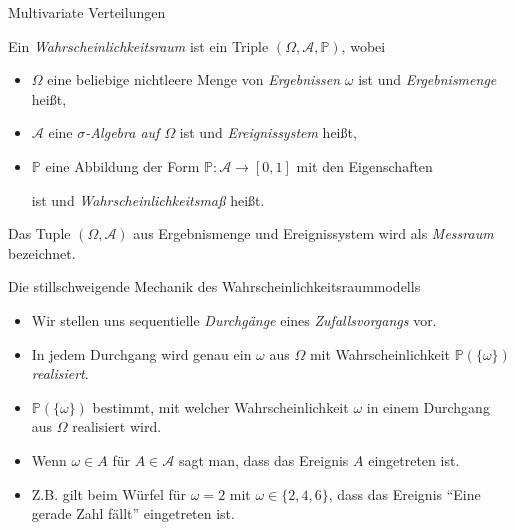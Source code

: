 \documentclass[
  8pt,
  ignorenonframetext,
]{beamer}
\providecommand{\tightlist}{%
  \setlength{\itemsep}{0pt}\setlength{\parskip}{0pt}}
\begin{document}
\begin{frame}{Multivariate Verteilungen}
\protect\hypertarget{multivariate-verteilungen}{}
\footnotesize
\begin{definition}[Wahrscheinlichkeitsraum]
\justifying
Ein \textit{Wahrscheinlichkeitsraum} ist ein Triple $(\Omega, \mathcal{A}, \mathbb{P})$, wobei
\begin{itemize}
\item $\Omega$ eine beliebige nichtleere Menge von \textit{Ergebnissen} $\omega$ ist und \textit{Ergebnismenge} heißt,
\item $\mathcal{A}$ eine \textit{$\sigma$-Algebra auf $\Omega$} ist und \textit{Ereignissystem} heißt,
\item $\mathbb{P}$ eine Abbildung der Form $\mathbb{P}:\mathcal{A} \to [0,1]$ mit den Eigenschaften

\begin{itemize}

\end{itemize}
ist und \textit{Wahrscheinlichkeitsmaß} heißt.
\end{itemize}
Das Tuple $(\Omega, \mathcal{A})$ aus Ergebnismenge und Ereignissystem wird
als \textit{Messraum} bezeichnet.
\end{definition}

Die stillschweigende Mechanik des Wahrscheinlichkeitsraummodells

\begin{itemize}
\tightlist
\item
  Wir stellen uns sequentielle \emph{Durchgänge} eines
  \emph{Zufallsvorgangs} vor.
\item
  In jedem Durchgang wird genau ein \(\omega\) aus \(\Omega\) mit
  Wahrscheinlichkeit \(\mathbb{P}(\{\omega\})\) \emph{realisiert}.
\item
  \(\mathbb{P}(\{\omega\})\) bestimmt, mit welcher Wahrscheinlichkeit
  \(\omega\) in einem Durchgang aus \(\Omega\) realisiert wird.
\item
  Wenn \(\omega \in A\) für \(A \in \mathcal{A}\) sagt man, dass das
  Ereignis \(A\) eingetreten ist.
\item
  Z.B. gilt beim Würfel für \(\omega = 2\) mit \(\omega \in \{2,4,6\}\),
  dass das Ereignis ``Eine gerade Zahl fällt'' eingetreten ist.
\end{itemize}
\end{frame}
\end{document}
